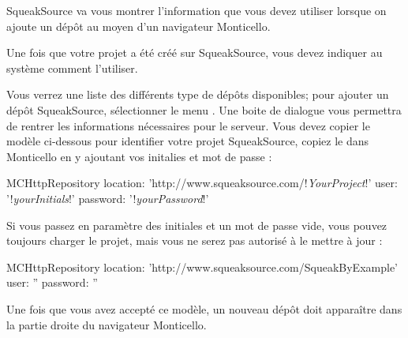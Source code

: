 \documentclass[a4paper,10pt,twoside]{book}
\begin{document}
SqueakSource va vous montrer l'information que vous devez utiliser lorsque on ajoute un dépôt au moyen d'un navigateur Monticello.

Une fois que votre projet a été créé sur SqueakSource, vous devez indiquer au système \squeak comment l'utiliser.

  Vous verrez une liste des différents type de dépôts disponibles; pour ajouter un dépôt SqueakSource, sélectionner le menu . Une boite de dialogue vous permettra de rentrer les informations nécessaires pour le serveur.
Vous devez copier le modèle ci-dessous pour identifier votre projet SqueakSource, copiez le dans Monticello en y ajoutant vos initalies et mot de passe :

\begin{code}{}
MCHttpRepository 
    location: 'http://www.squeaksource.com/!\emph{YourProject}!'
    user: '!\emph{yourInitials}!' 
    password: '!\emph{yourPassword}!'
\end{code}   

\noindent
Si vous passez en paramètre des initiales et un mot de passe vide, vous pouvez toujours charger le projet, mais vous ne serez pas autorisé à le mettre à jour :

\begin{code}{}
MCHttpRepository 
    location: 'http://www.squeaksource.com/SqueakByExample'
    user: '' 
    password: ''
\end{code}   

Une fois que vous avez accepté ce modèle, un nouveau dépôt doit apparaître dans la partie droite du navigateur Monticello.
\end{document}
